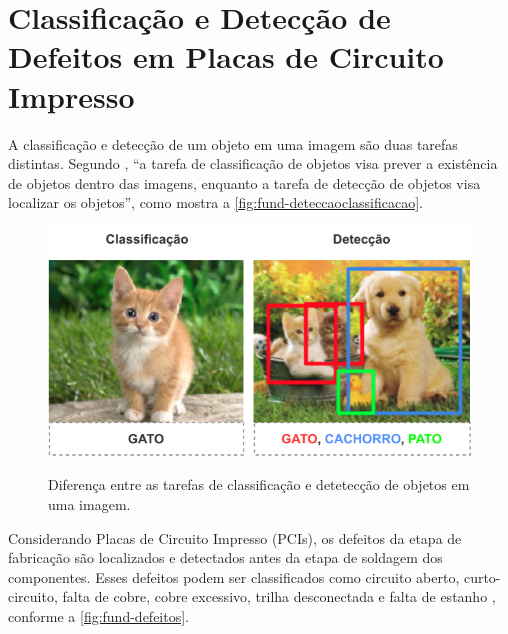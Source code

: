 \section{Classificação e Detecção de Defeitos em Placas de Circuito Impresso} \label{cap:fund-pcb}

A classificação e detecção de um objeto em uma imagem são duas tarefas distintas. Segundo , ``a tarefa de classificação de objetos visa prever a existência de objetos dentro das imagens, enquanto a tarefa de detecção de objetos visa localizar os objetos'', como mostra a \autoref{fig:fund-deteccaoclassificacao}.

\begin{figure}[h!] %
  \centering
  \caption{Diferença entre as tarefas de classificação e detetecção de objetos em uma imagem.}
  \includegraphics[scale=1.1]{img/img-fundamentacao-deteccaoclassificacao.pdf}
  \label{fig:fund-deteccaoclassificacao}
\end{figure}

Considerando Placas de Circuito Impresso (PCIs), os defeitos da etapa de fabricação são localizados e detectados antes da etapa de soldagem dos componentes. Esses defeitos podem ser classificados como circuito aberto, curto-circuito, falta de cobre, cobre excessivo, trilha desconectada e falta de estanho \cite{ref:Ding-et-al}, conforme a \autoref{fig:fund-defeitos}.

